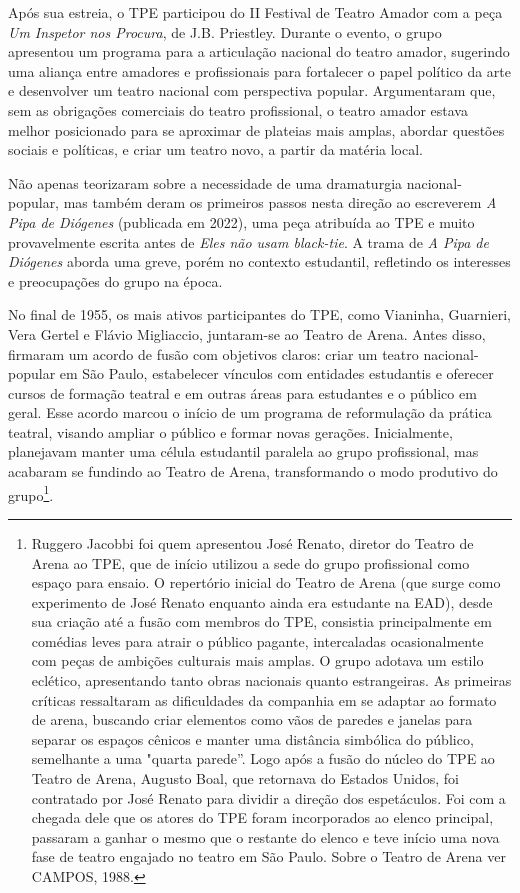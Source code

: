 Após sua estreia, o TPE participou do II Festival de Teatro Amador com a
peça \textit{Um Inspetor nos Procura}, de J.B. Priestley. Durante o evento,
o grupo apresentou um programa para a articulação nacional do teatro
amador, sugerindo uma aliança entre amadores e profissionais para
fortalecer o papel político da arte e desenvolver um teatro nacional com
perspectiva popular. Argumentaram que, sem as obrigações comerciais do
teatro profissional, o teatro amador estava melhor posicionado para se
aproximar de plateias mais amplas, abordar questões sociais e políticas,
e criar um teatro novo, a partir da matéria local.

Não apenas teorizaram sobre a necessidade de uma dramaturgia
nacional-popular, mas também deram os primeiros passos nesta direção ao
escreverem \textit{A Pipa de Diógenes} (publicada em 2022), uma peça
atribuída ao TPE e muito provavelmente escrita antes de \textit{Eles não
usam black-tie}. A trama de \textit{A Pipa de Diógenes} aborda uma greve,
porém no contexto estudantil, refletindo os interesses e preocupações do
grupo na época.

No final de 1955, os mais ativos participantes do TPE, como Vianinha,
Guarnieri, Vera Gertel e Flávio Migliaccio, juntaram-se ao Teatro de
Arena. Antes disso, firmaram um acordo de fusão com objetivos claros:
criar um teatro nacional-popular em São Paulo, estabelecer vínculos com
entidades estudantis e oferecer cursos de formação teatral e em outras
áreas para estudantes e o público em geral. Esse acordo marcou o início
de um programa de reformulação da prática teatral, visando ampliar o
público e formar novas gerações. Inicialmente, planejavam manter uma
célula estudantil paralela ao grupo profissional, mas acabaram se
fundindo ao Teatro de Arena, transformando o modo produtivo do
grupo\footnote{Ruggero Jacobbi foi quem apresentou José Renato, diretor
  do Teatro de Arena ao TPE, que de início utilizou a sede do grupo
  profissional como espaço para ensaio. O repertório inicial do Teatro
  de Arena (que surge como experimento de José Renato enquanto ainda era
  estudante na EAD), desde sua criação até a fusão com membros do TPE,
  consistia principalmente em comédias leves para atrair o público
  pagante, intercaladas ocasionalmente com peças de ambições culturais
  mais amplas. O grupo adotava um estilo eclético, apresentando tanto
  obras nacionais quanto estrangeiras. As primeiras críticas ressaltaram
  as dificuldades da companhia em se adaptar ao formato de arena,
  buscando criar elementos como vãos de paredes e janelas para separar
  os espaços cênicos e manter uma distância simbólica do público,
  semelhante a uma "quarta parede”. Logo após a fusão do núcleo do TPE
  ao Teatro de Arena, Augusto Boal, que retornava do Estados Unidos, foi
  contratado por José Renato para dividir a direção dos espetáculos. Foi
  com a chegada dele que os atores do TPE foram incorporados ao elenco
  principal, passaram a ganhar o mesmo que o restante do elenco e teve
  início uma nova fase de teatro engajado no teatro em São Paulo. Sobre
  o Teatro de Arena ver CAMPOS, 1988.}.

